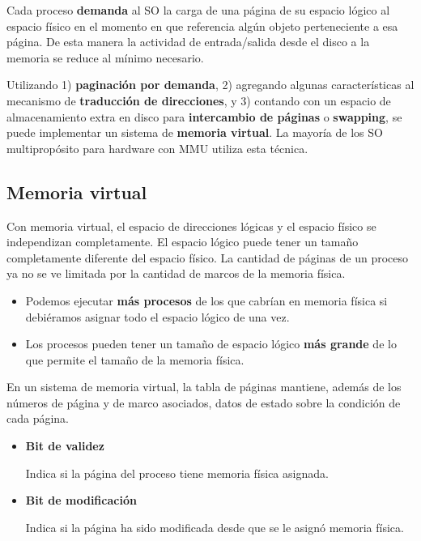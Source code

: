 \documentclass[spanish,A4,]{article}
\begin{document}
Cada proceso \textbf{demanda} al SO la carga de una página de su espacio
lógico al espacio físico en el momento en que referencia algún objeto
perteneciente a esa página. De esta manera la actividad de
entrada/salida desde el disco a la memoria se reduce al mínimo
necesario.

Utilizando 1) \textbf{paginación por demanda}, 2) agregando algunas
características al mecanismo de \textbf{traducción de direcciones}, y 3)
contando con un espacio de almacenamiento extra en disco para
\textbf{intercambio de páginas} o \textbf{swapping}, se puede
implementar un sistema de \textbf{memoria virtual}. La mayoría de los SO
multipropósito para hardware con MMU utiliza esta técnica.

\subsection{Memoria virtual}\label{memoria-virtual}

Con memoria virtual, el espacio de direcciones lógicas y el espacio
físico se independizan completamente. El espacio lógico puede tener un
tamaño completamente diferente del espacio físico. La cantidad de
páginas de un proceso ya no se ve limitada por la cantidad de marcos de
la memoria física.

\begin{itemize}
\itemsep1pt\parskip0pt
\item
  Podemos ejecutar \textbf{más procesos} de los que cabrían en memoria
  física si debiéramos asignar todo el espacio lógico de una vez.
\item
  Los procesos pueden tener un tamaño de espacio lógico \textbf{más
  grande} de lo que permite el tamaño de la memoria física.
\end{itemize}

En un sistema de memoria virtual, la tabla de páginas mantiene, además
de los números de página y de marco asociados, datos de estado sobre la
condición de cada página.

\begin{itemize}
\item
  \textbf{Bit de validez}

  Indica si la página del proceso tiene memoria física asignada.
\item
  \textbf{Bit de modificación}

  Indica si la página ha sido modificada desde que se le asignó memoria
  física.
\end{itemize}
\end{document}
